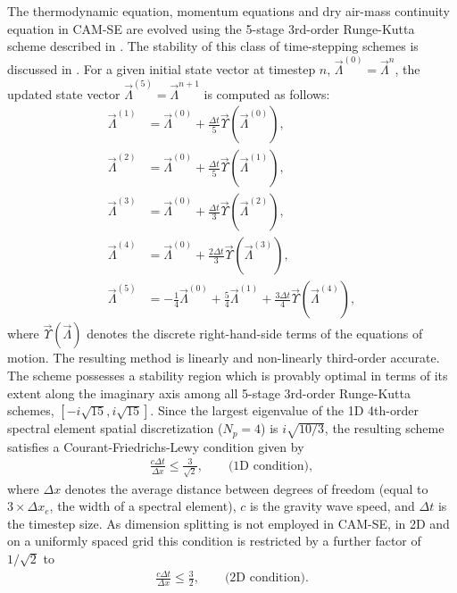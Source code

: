 \documentclass{agujournal}
\begin{document}
{The thermodynamic equation, momentum equations and dry air-mass continuity equation in CAM-SE are evolved using the 5-stage 3rd-order Runge-Kutta scheme described in \citet[][ see their equation (56)]{GU2016GMD}.  The stability of this class of time-stepping schemes is discussed in \citet[][ see their section 3.4]{DetAl2015GMD}.  For a given initial state vector at timestep $n$, $\vec{\Lambda}^{(0)} = \vec{\Lambda}^n$, the updated state vector $\vec{\Lambda}^{(5)} = \vec{\Lambda}^{n+1}$ is computed as follows:
\begin{align}
\vec{\Lambda}^{(1)} &= \vec{\Lambda}^{(0)} + \tfrac{\Delta t}{5} \vec{\Upsilon}(\vec{\Lambda}^{(0)}), \nonumber \\
\vec{\Lambda}^{(2)} &= \vec{\Lambda}^{(0)} + \tfrac{\Delta t}{5} \vec{\Upsilon}(\vec{\Lambda}^{(1)}), \nonumber \\
\vec{\Lambda}^{(3)} &= \vec{\Lambda}^{(0)} + \tfrac{\Delta t}{3} \vec{\Upsilon}(\vec{\Lambda}^{(2)}), \\
\vec{\Lambda}^{(4)} &= \vec{\Lambda}^{(0)} + \tfrac{2 \Delta t}{3} \vec{\Upsilon}(\vec{\Lambda}^{(3)}), \nonumber \\
\vec{\Lambda}^{(5)} &= -\tfrac{1}{4} \vec{\Lambda}^{(0)} + \tfrac{5}{4} \vec{\Lambda}^{(1)} + \tfrac{3 \Delta t}{4} \vec{\Upsilon}(\vec{\Lambda}^{(4)}), \nonumber
\end{align} where $\vec{\Upsilon}(\vec{\Lambda})$ denotes the discrete right-hand-side terms of the equations of motion.  The resulting method is linearly and non-linearly third-order accurate.  The scheme possesses a stability region which is provably optimal in terms of its extent along the imaginary axis among all 5-stage 3rd-order Runge-Kutta schemes, $[-i\sqrt{15}, i\sqrt{15}]$.  Since the largest eigenvalue of the 1D 4th-order spectral element spatial discretization ($N_p = 4$) is $i \sqrt{10/3}$, the resulting scheme satisfies a Courant-Friedrichs-Lewy condition given by
\begin{align}
\frac{c \Delta t}{\Delta x} \leq \frac{3}{\sqrt{2}}, \qquad \mbox{(1D condition)},
\end{align} where $\Delta x$ denotes the average distance between degrees of freedom (equal to $3 \times \Delta x_e$, the width of a spectral element), $c$ is the gravity wave speed, and $\Delta t$ is the timestep size.  As dimension splitting is not employed in CAM-SE, in 2D and on a uniformly spaced grid this condition is restricted by a further factor of $1/\sqrt{2}$ to
\begin{align}
\frac{c \Delta t}{\Delta x} \leq \frac{3}{2}, \qquad \mbox{(2D condition)}.
\end{align}
%
}
\end{document}

